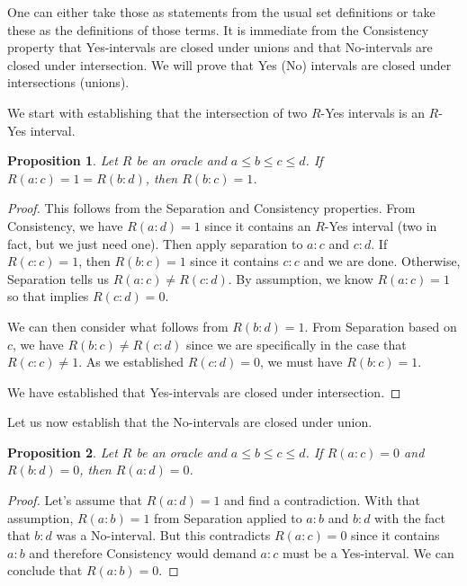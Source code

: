 \documentclass[12pt]{article}
\newtheorem{proposition}{Proposition}
\theoremstyle{remark}
\begin{document}
One can either take those as statements from the usual set definitions or take these as the definitions of those terms. It is immediate from the Consistency property that Yes-intervals are closed under unions and that No-intervals are closed under intersection. We will prove that Yes (No) intervals are closed under intersections (unions). 

We start with establishing that the intersection of two $R$-Yes intervals is an $R$-Yes interval.

\begin{proposition}\label{pr:inter}
Let $R$ be an oracle and $a \leq b \leq c \leq d$. If $R(a:c) = 1 = R(b:d)$, then $R(b:c) = 1$.
\end{proposition}

\begin{proof}
  
  This follows from the Separation and Consistency properties. From Consistency, we have $R(a:d) = 1$ since it contains an $R$-Yes interval (two in fact, but we just need one). Then apply separation to $a:c$ and $c:d$. If $R(c:c) = 1$, then $R(b:c) = 1$ since it contains $c:c$ and we are done. Otherwise, Separation tells us $R(a:c) \neq R(c:d)$. By assumption, we know $R(a:c) = 1$ so that implies $R(c:d) = 0$. 
  
  We can then consider what follows from $R(b:d) = 1$.  From Separation based on $c$, we have $R(b:c) \neq R(c:d)$ since we are specifically in the case that $R(c:c) \neq 1$. As we established $R(c:d) = 0$, we must have $R(b:c) = 1$.
  
  We have established that Yes-intervals are closed under intersection. 
\end{proof}

Let us now establish that the No-intervals are closed under union. 

\begin{proposition}\label{pr:union}
Let $R$ be an oracle and $a \leq b \leq c \leq d$.  If $R(a:c) = 0$ and $R(b:d) = 0$, then $R(a:d) = 0$. 
\end{proposition}

\begin{proof}
    Let's assume that $R(a:d) = 1$ and find a contradiction. With that assumption, $R(a:b) = 1$ from Separation applied to $a:b$ and $b:d$ with the fact that $b:d$ was a No-interval. But this contradicts $R(a:c)= 0$ since it contains $a:b$ and therefore Consistency would demand $a:c$ must be a Yes-interval. We can conclude that $R(a:b) =0$.
\end{proof}
\end{document}
